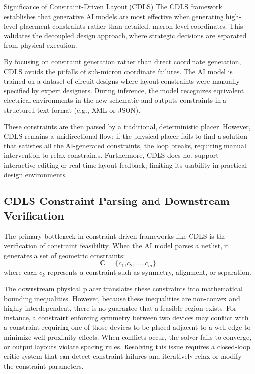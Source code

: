 \begin{thesisremark}{Significance of Constraint-Driven Layout (CDLS)}
  The CDLS framework~\cite{cdls} establishes that generative AI models are most effective when generating high-level placement constraints rather than detailed, micron-level coordinates. This validates the decoupled design approach, where strategic decisions are separated from physical execution.
\end{thesisremark}

By focusing on constraint generation rather than direct coordinate generation, CDLS avoids the pitfalls of sub-micron coordinate failures. The AI model is trained on a dataset of circuit designs where layout constraints were manually specified by expert designers. During inference, the model recognizes equivalent electrical environments in the new schematic and outputs constraints in a structured text format (e.g., XML or JSON). 

These constraints are then parsed by a traditional, deterministic placer. However, CDLS remains a unidirectional flow; if the physical placer fails to find a solution that satisfies all the AI-generated constraints, the loop breaks, requiring manual intervention to relax constraints. Furthermore, CDLS does not support interactive editing or real-time layout feedback, limiting its usability in practical design environments.

\subsection{CDLS Constraint Parsing and Downstream Verification}

The primary bottleneck in constraint-driven frameworks like CDLS is the verification of constraint feasibility. When the AI model parses a netlist, it generates a set of geometric constraints:
\begin{equation}
    \mathbf{C} = \{ c_1, c_2, \dots, c_m \}
\end{equation}
where each $c_k$ represents a constraint such as symmetry, alignment, or separation. 

The downstream physical placer translates these constraints into mathematical bounding inequalities. However, because these inequalities are non-convex and highly interdependent, there is no guarantee that a feasible region exists. For instance, a constraint enforcing symmetry between two devices may conflict with a constraint requiring one of those devices to be placed adjacent to a well edge to minimize well proximity effects. When conflicts occur, the solver fails to converge, or output layouts violate spacing rules. Resolving this issue requires a closed-loop critic system that can detect constraint failures and iteratively relax or modify the constraint parameters.

